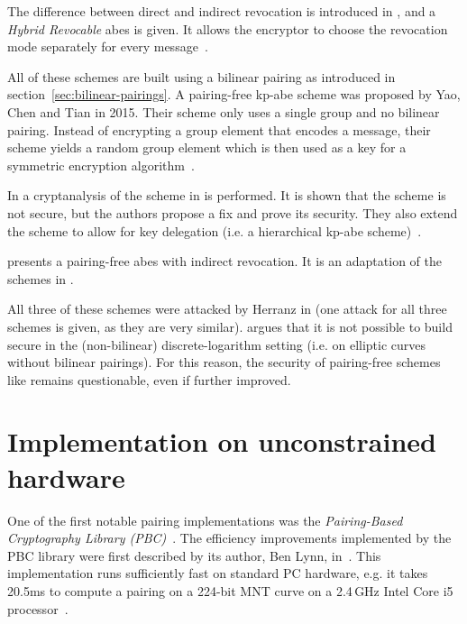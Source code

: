 The difference between direct and indirect revocation is introduced in \cite{attrapadung_attribute-based_2009}, and a \emph{Hybrid Revocable} \acrshort{abes} is given.
It allows the encryptor to choose the revocation mode separately for every message~\cite{attrapadung_attribute-based_2009}.

All of these schemes are built using a bilinear pairing as introduced in section~\ref{sec:bilinear-pairings}.
A pairing-free \acrshort{kp-abe} scheme was proposed by Yao, Chen and Tian \cite{yao_lightweight_2015} in 2015.
Their scheme only uses a single group and no bilinear pairing.
Instead of encrypting a group element that encodes a message, their scheme yields a random group element which is then used as a key for a symmetric encryption algorithm~\cite{yao_lightweight_2015}.

In \cite{tan_enhancement_2019} a cryptanalysis of the scheme in \cite{yao_lightweight_2015} is performed.
It is shown that the scheme is not secure, but the authors propose a fix and prove its security.
They also extend the scheme to allow for key delegation (i.e. a hierarchical \acrshort{kp-abe} scheme)~\cite{tan_enhancement_2019}.

\cite{sowjanya_efficient_2020} presents a pairing-free \acrshort{abes} with indirect revocation.
It is an adaptation of the schemes in \cite{yao_lightweight_2015,tan_enhancement_2019}.

All three of these schemes were attacked by Herranz in \cite{herranz_attacking_2020} (one attack for all three schemes is given, as they are very similar).
\cite{herranz_attacking_2020} argues that it is not possible to build secure  in the (non-bilinear) discrete-logarithm setting (i.e. on elliptic curves without bilinear pairings).
For this reason, the security of pairing-free schemes like \cite{yao_lightweight_2015,sowjanya_efficient_2020,tan_enhancement_2019} remains questionable, even if further improved.

\section{Implementation on unconstrained hardware}
One of the first notable pairing implementations was the \emph{Pairing-Based Cryptography Library (PBC)}~\cite{lynn_pairing-based_nodate, lynn_implementation_2007}.
The efficiency improvements implemented by the PBC library were first described by its author, Ben Lynn, in~\cite{lynn_implementation_2007}.
This implementation runs sufficiently fast on standard PC hardware, e.g. it takes 20.5ms to compute a pairing on a 224-bit MNT curve on a 2.4\,GHz Intel Core i5 processor~\cite{akinyele_self-protecting_2010}.

